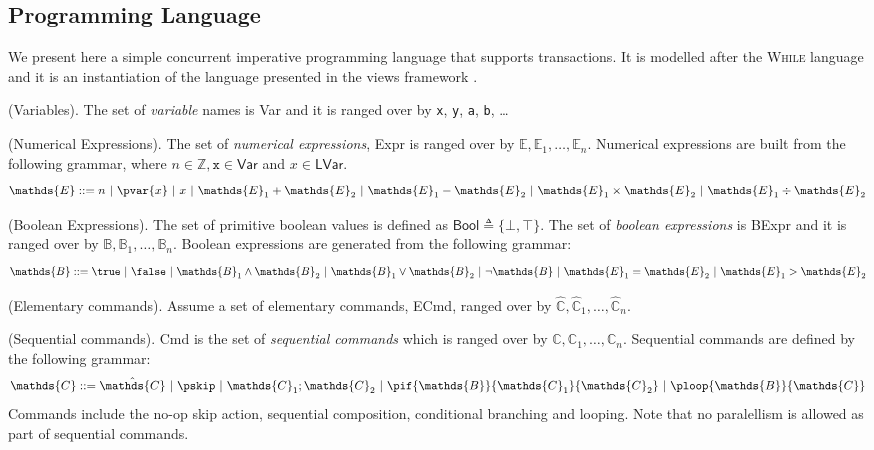 \subsection{Programming Language}
\label{language}

We present here a simple concurrent imperative programming language that supports transactions. It is modelled after the \textsc{While} language and it is an instantiation of the language presented in the views framework \cite{views}.

\begin{defn}
	(Variables).
	The set of \emph{variable} names is \textsf{Var} and it is ranged over by \texttt{x}, \texttt{y}, \texttt{a}, \texttt{b}, \ldots
\end{defn}

\begin{defn}
	(Numerical Expressions).
	The set of \emph{numerical expressions}, \textsf{Expr} is ranged over by $\mathds{E}, \mathds{E}_1, \ldots, \mathds{E}_n$. Numerical expressions are built from the following grammar, where $n \in \mathds{Z}, \mathtt{x} \in \mathsf{Var}$ and $x \in \mathsf{LVar}$.
	\[
		\mathds{E} ::=
			n\
			|\ \pvar{x}\
			|\ x\
			|\ \mathds{E}_1 + \mathds{E}_2\
			|\ \mathds{E}_1 - \mathds{E}_2\
			|\ \mathds{E}_1 \times \mathds{E}_2\
			|\ \mathds{E}_1 \div \mathds{E}_2
	\]
\end{defn}

\begin{defn}
	(Boolean Expressions).
	The set of primitive boolean values is defined as $\mathsf{Bool} \triangleq \{ \bot, \top \}$. The set of \emph{boolean expressions} is \textsf{BExpr} and it is ranged over by $\mathds{B}, \mathds{B}_1, \ldots, \mathds{B}_n$. Boolean expressions are generated from the following grammar:
	\[
		\mathds{B} ::=
			\true\
			|\ \false\
			|\ \mathds{B}_1 \land \mathds{B}_2\
			|\ \mathds{B}_1 \lor \mathds{B}_2\
			|\ \lnot \mathds{B}\
			|\ \mathds{E}_1 = \mathds{E}_2\
			|\ \mathds{E}_1 > \mathds{E}_2
	\]
\end{defn}

\begin{param}
	(Elementary commands).
	Assume a set of elementary commands, \textsf{ECmd}, ranged over by $\hat{\mathds{C}}, \hat{\mathds{C}}_1, \ldots, \hat{\mathds{C}}_n$.
\end{param}

\begin{defn}
	(Sequential commands).
	\textsf{Cmd} is the set of \emph{sequential commands} which is ranged over by $\mathds{C}, \mathds{C}_1, \ldots, \mathds{C}_n$. Sequential commands are defined by the following grammar:
	\[
		\mathds{C} ::=
			\hat{\mathds{C}}\
			|\ \pskip\
			|\ \mathds{C}_1; \mathds{C}_2\
			|\ \pif{\mathds{B}}{\mathds{C}_1}{\mathds{C}_2}\
			|\ \ploop{\mathds{B}}{\mathds{C}}
	\]
	Commands include the no-op skip action, sequential composition, conditional branching and looping. Note that no paralellism is allowed as part of sequential commands.
\end{defn}

